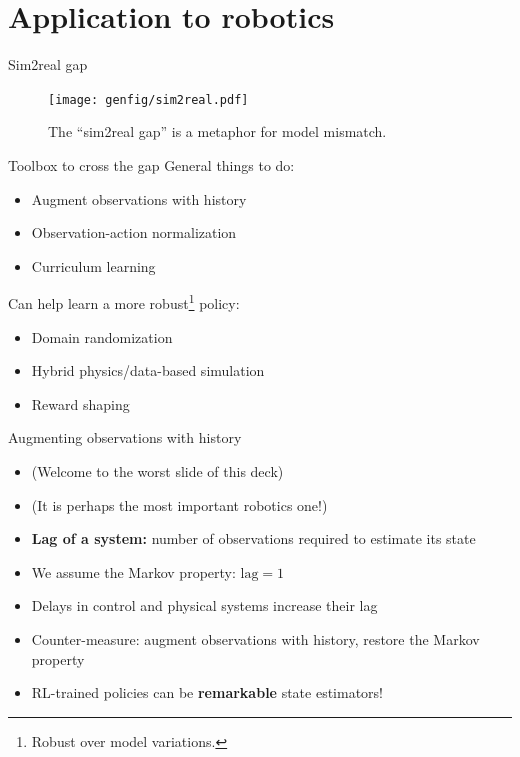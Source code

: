 \documentclass[10pt, aspectratio=1610]{beamer}
\begin{document}
\section{Application to robotics}

\begin{frame}{Sim2real gap}
    \begin{figure}
        \texttt{[image: genfig/sim2real.pdf]}
        \caption{The ``sim2real gap'' is a metaphor for model mismatch.}
    \end{figure}
\end{frame}

\begin{frame}{Toolbox to cross the gap}
    General things to do:
    \begin{itemize}
        \item Augment observations with history
        \item Observation-action normalization
        \item Curriculum learning
    \end{itemize}
    Can help learn a more robust\footnote{Robust over model variations.} policy:
    \begin{itemize}
        \item Domain randomization
        \item Hybrid physics/data-based simulation
        \item Reward shaping
    \end{itemize}
\end{frame}

\begin{frame}{Augmenting observations with history}
    \begin{itemize}
        \item (Welcome to the worst slide of this deck)
        \item (It is perhaps the most important robotics one!)
        \item \textbf{Lag of a system:} number of observations required to estimate its state
        \item We assume the Markov property: $\mathrm{lag} = 1$
        \item Delays in control and physical systems increase their lag
        \item Counter-measure: augment observations with history, restore the Markov property
        \item RL-trained policies can be \textbf{remarkable} state estimators!
    \end{itemize}
\end{frame}
\end{document}
